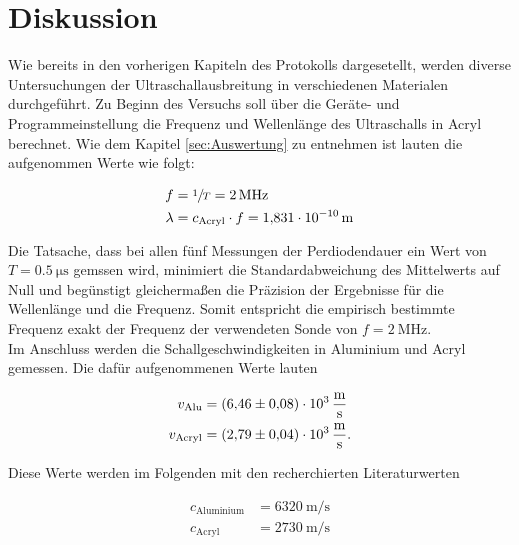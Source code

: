 


\section{Diskussion}
\label{sec:Diskussion}

Wie bereits in den vorherigen Kapiteln des Protokolls dargesetellt, werden diverse Untersuchungen der Ultraschallausbreitung 
in verschiedenen Materialen durchgeführt. Zu Beginn des Versuchs soll über die Geräte- und Programmeinstellung die Frequenz 
und Wellenlänge des Ultraschalls in Acryl berechnet. Wie dem Kapitel \ref{sec:Auswertung} zu entnehmen ist lauten die 
aufgenommen Werte wie folgt:

\begin{align*}
    f &= \sfrac{1}{T} = \qty{2}{\mega\hertz}\\
    \lambda &= c_\text{Acryl}\cdot{}f = \qty{1.831e-10}{\meter}
\end{align*}

\noindent Die Tatsache, dass bei allen fünf Messungen der Perdiodendauer ein Wert von $T = \qty{0.5}{\micro\second}$ gemssen 
wird, minimiert die Standardabweichung des Mittelwerts auf Null und begünstigt gleichermaßen die Präzision der Ergebnisse 
für die Wellenlänge und die Frequenz. Somit entspricht die empirisch bestimmte Frequenz exakt der Frequenz der verwendeten 
Sonde von $f = \qty{2}{\mega\hertz}$.\\

\noindent Im Anschluss werden die Schallgeschwindigkeiten in Aluminium und Acryl gemessen. Die dafür aufgenommenen Werte lauten 

\begin{align*}
    v_\text{Alu} &= \qty{6.46\pm0.08e3}{\meter\per\second} \\
    v_\text{Acryl} &= \qty{2.79\pm0.04e3}{\meter \per \second}.
\end{align*}

\noindent Diese Werte werden im Folgenden mit den recherchierten Literaturwerten

\begin{align*}
    c_\text{Aluminium} &= \qty{6320}{\meter \per \second}\\
    c_\text{Acryl}  &= \qty{2730}{\meter \per \second}
\end{align*}

